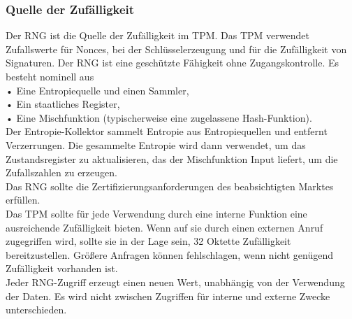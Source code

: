 \subsubsection{Quelle der Zufälligkeit}
Der RNG ist die Quelle der Zufälligkeit im TPM. Das TPM verwendet Zufallswerte für Nonces, bei der Schlüsselerzeugung und für die Zufälligkeit von Signaturen.
Der RNG ist eine geschützte Fähigkeit ohne Zugangskontrolle. Es besteht nominell aus \\
• Eine Entropiequelle und einen Sammler, \\
• Ein staatliches Register, \\
• Eine Mischfunktion (typischerweise eine zugelassene Hash-Funktion). \\
Der Entropie-Kollektor sammelt Entropie aus Entropiequellen und entfernt Verzerrungen. Die gesammelte Entropie wird dann verwendet, um das Zustandsregister zu aktualisieren, das der Mischfunktion Input liefert, um die Zufallszahlen zu erzeugen. \\
Das RNG sollte die Zertifizierungsanforderungen des beabsichtigten Marktes erfüllen. \\
Das TPM sollte für jede Verwendung durch eine interne Funktion eine ausreichende Zufälligkeit bieten. Wenn auf sie durch einen externen Anruf zugegriffen wird, sollte sie in der Lage sein, 32 Oktette Zufälligkeit bereitzustellen. Größere Anfragen können fehlschlagen, wenn nicht genügend Zufälligkeit vorhanden ist. \\
Jeder RNG-Zugriff erzeugt einen neuen Wert, unabhängig von der Verwendung der Daten. Es wird nicht zwischen Zugriffen für interne und externe Zwecke unterschieden.

